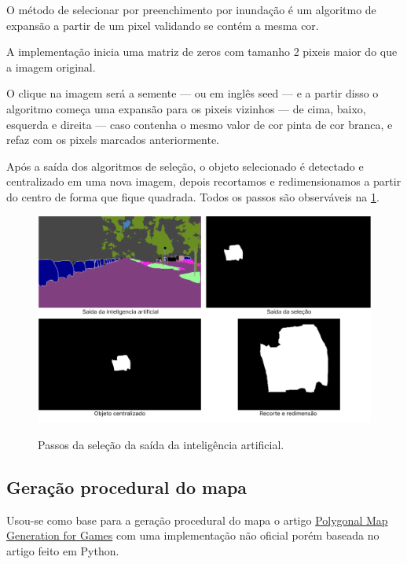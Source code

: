 
O método de  selecionar por preenchimento por inundação é um algoritmo de expansão a partir de um pixel validando se contém a mesma cor.

A implementação inicia uma matriz de zeros com tamanho 2 pixeis maior do que a imagem original.

O clique na  imagem será a semente — ou em inglês  seed — e a partir disso o algoritmo começa uma expansão para os pixeis vizinhos — de cima, baixo, esquerda e direita — caso contenha o mesmo valor de cor pinta de cor branca, e refaz com os pixels marcados  anteriormente.


Após a saída dos algoritmos de seleção, o objeto selecionado é detectado e centralizado em uma nova imagem, depois recortamos e redimensionamos a partir do centro de forma que fique quadrada. Todos os passos são observáveis na \cref{fig:saidas_selecao}.

\begin{figure}[!ht]
	\centering
    \caption{Passos da seleção da saída da inteligência  artificial.}
	\includegraphics[width=1.0\textwidth]{figures/saidas_selecao.png}
	\label{fig:saidas_selecao}
\end{figure}

\subsection{Geração procedural do mapa}

Usou-se como base para a geração procedural do mapa o artigo \hyperref[sec:geracaoProcedural]{Polygonal Map Generation for Games} com uma implementação não oficial porém baseada no artigo feito em Python.

